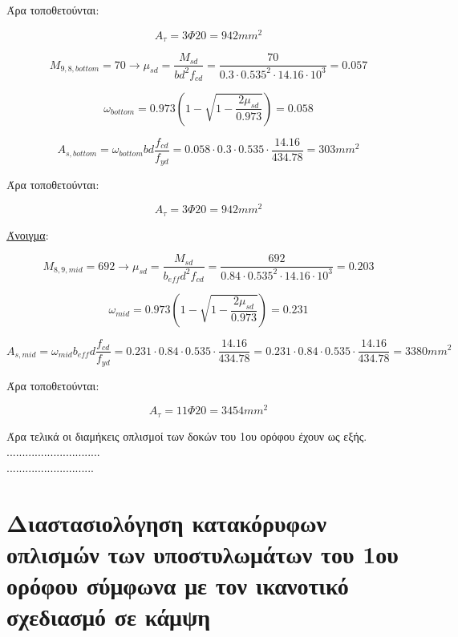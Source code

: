 \noindent
Άρα τοποθετούνται:

\[
A_{\tau} = 3\Phi20 = 942mm^2
\]

\[
M_{9,8,bottom} = 70 \rightarrow \mu_{sd} = \dfrac{M_{sd}}{b d^2 f_{cd}} = \dfrac{70}{0.3\cdot0.535^2\cdot14.16\cdot10^3} = 0.057
\]

\[
\omega_{bottom} = 0.973\left( 1 - \sqrt{1 - \dfrac{2\mu_{sd}}{0.973}} \right) = 0.058
\]

\[
A_{s,bottom} = \omega_{bottom}b d \dfrac{f_{cd}}{f_{yd}} = 0.058\cdot 0.3 \cdot 0.535 \cdot \dfrac{14.16}{434.78} = 303mm^2
\]

\noindent
Άρα τοποθετούνται:

\[
A_{\tau} = 3\Phi20 = 942mm^2
\]

\noindent
\underline{Άνοιγμα}:

\bigskip

\[
M_{8,9,mid} = 692 \rightarrow \mu_{sd} = \dfrac{M_{sd}}{b_{eff} d^2 f_{cd}} = \dfrac{692}{0.84\cdot0.535^2\cdot14.16\cdot10^3} = 0.203
\]

\[
\omega_{mid} = 0.973\left( 1 - \sqrt{1 - \dfrac{2\mu_{sd}}{0.973}} \right) = 0.231
\]

\[
A_{s,mid} = \omega_{mid}b_{eff} d \dfrac{f_{cd}}{f_{yd}} = 0.231\cdot 0.84 \cdot 0.535 \cdot \dfrac{14.16}{434.78} = 0.231\cdot 0.84 \cdot 0.535 \cdot \dfrac{14.16}{434.78} = 3380 mm^2
\]

\noindent
Άρα τοποθετούνται:

\[
A_{\tau} = 11\Phi20 = 3454 mm^2
\]

Άρα τελικά οι διαμήκεις οπλισμοί των δοκών του 1ου ορόφου έχουν ως εξής.
..............................\\
............................

\section{Διαστασιολόγηση κατακόρυφων οπλισμών των υποστυλωμάτων του 1ου ορόφου σύμφωνα με τον ικανοτικό σχεδιασμό σε κάμψη}
